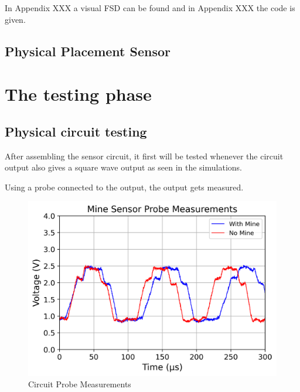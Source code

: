 In Appendix XXX a visual FSD can be found and in Appendix XXX the code is given.

\subsection{Physical Placement Sensor}


\newpage
\section{The testing phase}
\subsection{Physical circuit testing}
After assembling the sensor circuit, it first will be tested whenever the circuit output also gives a square wave output as seen in the simulations.

Using a probe connected to the output, the output gets measured.

\begin{figure}[h]
    \centering
    \includegraphics[scale = 0.7]{EPO 2 Images & Plots/Mine Sensor/V3_Total.png}
    \caption{Circuit Probe Measurements}
    \label{fig:meas_sensor_neutral}
\end{figure}


